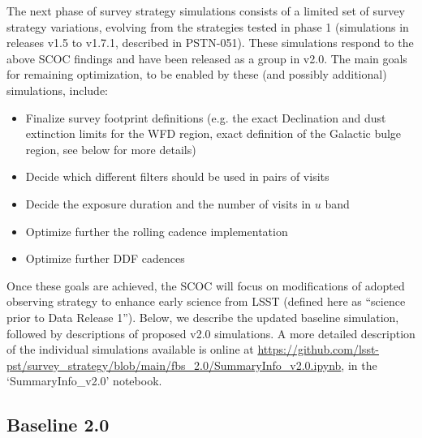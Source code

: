 The next phase of survey strategy simulations consists of a limited set of survey strategy variations, evolving from the strategies tested in phase 1 (simulations in releases v1.5 to v1.7.1, described in PSTN-051). These simulations respond to the above SCOC findings and have been released as a group in v2.0. The main goals for remaining optimization, to be enabled by these (and possibly additional) simulations,  include:
\begin{itemize}
\item{Finalize survey footprint definitions (e.g. the exact Declination and dust extinction 
            limits for  the WFD region, exact definition of the Galactic bulge region, see below for 
            more details)}
\item{Decide which different filters should be used in pairs of visits}
\item{Decide the exposure duration and the number of visits in $u$ band }
\item{Optimize further the rolling cadence implementation }
\item{Optimize further DDF cadences }
\end{itemize}

Once these goals are achieved, the SCOC will focus on modifications of adopted observing strategy to enhance early science from LSST (defined here as ``science prior to Data Release 1''). Below, we describe the updated baseline simulation, followed by descriptions of proposed v2.0 simulations. A more detailed description of the individual simulations available is online at \url{https://github.com/lsst-pst/survey_strategy/blob/main/fbs_2.0/SummaryInfo_v2.0.ipynb}, in the `SummaryInfo\_v2.0' notebook. 

\subsection{Baseline 2.0}

